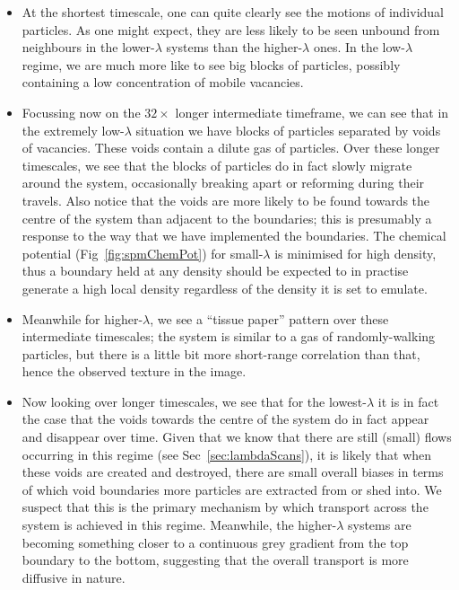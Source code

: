 \begin{itemize}
 \item At the shortest timescale, one can quite clearly see the motions of individual particles. As one
 might expect, they are less likely to be seen unbound from neighbours in the lower-$\lambda$ systems than
 the higher-$\lambda$ ones. In the low-$\lambda$ regime, we are much more like to see big blocks of 
 particles, possibly containing a low concentration of mobile vacancies.
 \item Focussing now on the $32\times$ longer intermediate timeframe, we can see that in the extremely 
 low-$\lambda$
 situation we have blocks of particles separated by voids of vacancies. These voids contain a dilute gas
 of particles. Over these longer timescales, we see that the blocks of particles do in fact slowly migrate
 around the system, occasionally breaking apart or reforming during their travels. Also notice that the 
 voids are more likely to be found towards the centre of the system than adjacent to the boundaries;
 this is presumably a response to the way that we have implemented the boundaries. The chemical potential
 (Fig~\ref{fig:spmChemPot}) for small-$\lambda$ is minimised for high density, thus a boundary held at any
 density should be expected to in practise generate a high local density regardless of the density it is
 set to emulate.
 \item Meanwhile for higher-$\lambda$, we see a ``tissue paper'' pattern over these intermediate
 timescales; the system is similar to a gas of randomly-walking particles, but there is a little bit more
 short-range correlation than that, hence the observed texture in the image.
 \item Now looking over longer timescales, we see that for the lowest-$\lambda$ it is in fact the case that 
 the voids towards the centre of the system do in fact appear and disappear over time. Given that we know 
 that there are still (small) flows occurring in this regime (see Sec~\ref{sec:lambdaScans}), it is
 likely that when these voids are created and destroyed, there are small overall biases in terms of
 which void boundaries more particles are extracted from or shed into. We suspect that
 this is the primary mechanism by which transport across the system is achieved in this regime. Meanwhile,
 the higher-$\lambda$ systems are becoming something closer to a continuous grey gradient from the top
 boundary to the bottom, suggesting that the overall transport is more diffusive in nature.
\end{itemize}



